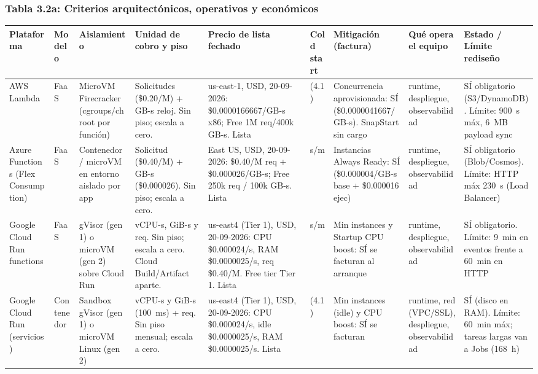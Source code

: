 \documentclass[12pt, letterpaper, table, xcdraw]{inf-pucv}
\begin{document}
\begin{landscape}
\subsubsection*{Tabla 3.2a: Criterios arquitectónicos, operativos y económicos}
{\makeatletter\def\@currentlabel{3.2a}\makeatother\label{tab:cuadro-3-2a}}

{\scriptsize
\setlength{\tabcolsep}{3pt}
\begin{longtable}{|p{2.1cm}|p{1.6cm}|p{2.4cm}|p{2.8cm}|p{3.1cm}|p{1.0cm}|p{2.1cm}|p{2.6cm}|p{2.8cm}|}
\hline
\textbf{Plataforma} & \textbf{Modelo} & \textbf{Aislamiento} & \textbf{Unidad de cobro y piso} & \textbf{Precio de lista fechado} & \textbf{Cold start} & \textbf{Mitigación (factura)} & \textbf{Qué opera el equipo} & \textbf{Estado / Límite rediseño} \\ \hline
\endhead

AWS Lambda & FaaS & MicroVM Firecracker (cgroups/chroot por función) & Solicitudes (\$0.20/M) + GB-s reloj. Sin piso; escala a cero. & us-east-1, USD, 20-09-2026: \$0.0000166667/GB-s x86; Free 1M req/400k GB-s. Lista & (4.1) & Concurrencia aprovisionada: SÍ (\$0.0000041667/GB-s). SnapStart sin cargo & runtime, despliegue, observabilidad & SÍ obligatorio (S3/DynamoDB). Límite: 900~s máx, 6~MB payload sync \\ \hline

Azure Functions (Flex Consumption) & FaaS & Contenedor / microVM en entorno aislado por app & Solicitud (\$0.40/M) + GB-s (\$0.000026). Sin piso; escala a cero. & East US, USD, 20-09-2026: \$0.40/M req + \$0.000026/GB-s; Free 250k req / 100k GB-s. Lista & s/m & Instancias Always Ready: SÍ (\$0.000004/GB-s base + \$0.000016 ejec) & runtime, despliegue, observabilidad & SÍ obligatorio (Blob/Cosmos). Límite: HTTP máx 230~s (Load Balancer) \\ \hline

Google Cloud Run functions & FaaS & gVisor (gen 1) o microVM (gen 2) sobre Cloud Run & vCPU-s, GiB-s y req. Sin piso; escala a cero. Cloud Build/Artifact aparte. & us-east4 (Tier 1), USD, 20-09-2026: CPU \$0.000024/s, RAM \$0.0000025/s, req \$0.40/M. Free tier Tier 1. Lista & s/m & Min instances y Startup CPU boost: SÍ se facturan al arranque & runtime, despliegue, observabilidad & SÍ obligatorio. Límite: 9~min en eventos frente a 60~min en HTTP \\ \hline

Google Cloud Run (servicios) & Contenedor & Sandbox gVisor (gen 1) o microVM Linux (gen 2) & vCPU-s y GiB-s (100~ms) + req. Sin piso mensual; escala a cero. & us-east4 (Tier 1), USD, 20-09-2026: CPU \$0.000024/s, idle \$0.0000025/s, RAM \$0.0000025/s. Lista & (4.1) & Min instances (idle) y CPU boost: SÍ se facturan & runtime, red (VPC/SSL), despliegue, observabilidad & SÍ (disco en RAM). Límite: 60~min máx; tareas largas van a Jobs (168~h) \\ \hline


\end{longtable}}
\end{landscape}
\end{document}
